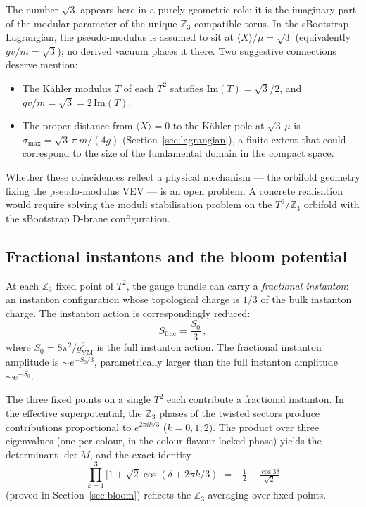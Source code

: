 \documentclass[12pt,a4paper]{article}
\begin{document}
The number $\sqrt{3}$ appears here in a purely geometric role: it is
the imaginary part of the modular parameter of the unique
$\mathbb{Z}_3$-compatible torus.  In the sBootstrap Lagrangian, the
pseudo-modulus is assumed to sit at $\langle X\rangle/\mu = \sqrt{3}$
(equivalently $gv/m = \sqrt{3}$); no derived vacuum places it there.  Two suggestive connections
deserve mention:
\begin{itemize}
\item The K\"ahler modulus $T$ of each $T^2$ satisfies
  $\mathrm{Im}(T) = \sqrt{3}/2$, and
  $gv/m = \sqrt{3} = 2\,\mathrm{Im}(T)$.
\item The proper distance from $\langle X\rangle = 0$ to the
  K\"ahler pole at $\sqrt{3}\,\mu$ is
  $\sigma_{\max} = \sqrt{3}\,\pi\,m/(4g)$
  (Section~\ref{sec:lagrangian}), a finite extent
  that could correspond to the size of the fundamental domain
  in the compact space.
\end{itemize}

Whether these coincidences reflect a physical mechanism --- the
orbifold geometry fixing the pseudo-modulus VEV --- is an open
problem.  A concrete realisation would require solving the moduli
stabilisation problem on the $T^6/\mathbb{Z}_3$ orbifold with the
sBootstrap D-brane configuration.

\subsection{Fractional instantons and the bloom potential}

At each $\mathbb{Z}_3$ fixed point of $T^2$, the gauge bundle can
carry a \emph{fractional instanton}: an instanton configuration whose
topological charge is $1/3$ of the bulk instanton charge.  The
instanton action is correspondingly reduced:
\begin{equation}
  S_{\text{frac}} = \frac{S_0}{3}\,,
\end{equation}
where $S_0 = 8\pi^2/g_{\text{YM}}^2$ is the full instanton action.
The fractional instanton amplitude is $\sim e^{-S_0/3}$, parametrically
larger than the full instanton amplitude $\sim e^{-S_0}$.

The three fixed points on a single $T^2$ each contribute a fractional
instanton.  In the effective superpotential, the $\mathbb{Z}_3$ phases
of the twisted sectors produce contributions proportional to
$e^{2\pi i k/3}$ ($k = 0, 1, 2$).  The product over three
eigenvalues (one per colour, in the colour-flavour locked phase)
yields the determinant $\det M$, and the exact identity
\begin{equation}
  \prod_{k=1}^{3}\bigl[1 + \sqrt{2}\cos(\delta + 2\pi k/3)\bigr]
  = -\tfrac{1}{2} + \tfrac{\cos 3\delta}{\sqrt{2}}
\end{equation}
(proved in Section~\ref{sec:bloom}) reflects the $\mathbb{Z}_3$
averaging over fixed points.
\end{document}
